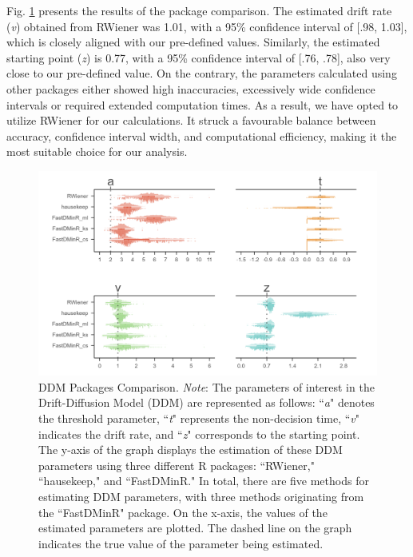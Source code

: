 \documentclass[sn-apa]{sn-jnl}%
\theoremstyle{thmstyleone}%
\theoremstyle{thmstyletwo}%
\theoremstyle{thmstylethree}%
\begin{document}
Fig. \ref{fig:DDM_comparision} presents the results of the package comparison. The estimated drift rate (\textit{v}) obtained from RWiener was 1.01, with a 95\% confidence interval of [.98, 1.03], which is closely aligned with our pre-defined values. Similarly, the estimated starting point (\textit{z}) is 0.77, with a 95\% confidence interval of [.76, .78], also very close to our pre-defined value. On the contrary, the parameters calculated using other packages either showed high inaccuracies, excessively wide confidence intervals or required extended computation times. As a result, we have opted to utilize RWiener for our calculations. It struck a favourable balance between accuracy, confidence interval width, and computational efficiency, making it the most suitable choice for our analysis.
\clearpage

\begin{figure}[!ht]
	\centering
	\includegraphics[width=1\textwidth]{./Figure/Fig2_DDM_comparision.png}
	\caption[DDM Packages Comparison]{DDM Packages Comparison. \textit{Note}: The parameters of interest in the Drift-Diffusion Model (DDM) are represented as follows: ``\textit{a}" denotes the threshold parameter, ``\textit{t}" represents the non-decision time, ``\textit{v}" indicates the drift rate, and ``\textit{z}" corresponds to the starting point. The y-axis of the graph displays the estimation of these DDM parameters using three different R packages: ``RWiener," ``hausekeep," and ``FastDMinR." In total, there are five methods for estimating DDM parameters, with three methods originating from the ``FastDMinR" package. On the x-axis, the values of the estimated parameters are plotted. The dashed line on the graph indicates the true value of the parameter being estimated.
	}\label{fig:DDM_comparision}
\end{figure}
\end{document}
